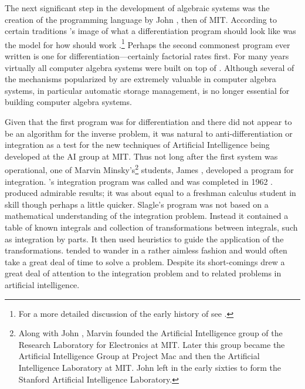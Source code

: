 The next significant step in the development of algebraic systems was
the creation of the programming language {\Lisp} by John {\McCarthy}
\cite{McCarthy1960-bz,McCarthy1969-af}, then of MIT.  According to certain
traditions {\McCarthy}'s image of what a differentiation program should
look like was the model for how {\Lisp} should work
\cite{McCarthy1960-op}.\footnote{For a more detailed
discussion of the early history of {\Lisp} see \cite{Stoyan1984-fn}.}
Perhaps the second commonest {\Lisp} program ever written is one for
differentiation---certainly factorial rates first.  For many years
virtually all computer algebra systems were built on top of {\Lisp}.  Although
several of the mechanisms popularized by {\Lisp} are extremely valuable in
computer algebra systems, in particular automatic storage management, {\Lisp}
is no longer essential for building computer algebra systems.

Given that the first {\Lisp} program was for differentiation and there
did not appear to be an algorithm for the inverse problem, it was
natural to anti-differentiation or integration as a test for the new
techniques of Artificial Intelligence being developed at the AI group
at MIT. Thus not long
after the first {\Lisp} system was operational, one of Marvin
Minsky's\footnote{Along with John {\McCarthy}, Marvin {\Minsky} founded the
Artificial Intelligence group of the Research Laboratory for
Electronics at MIT.  Later this group became the Artificial
Intelligence Group at Project Mac and then the Artificial Intelligence
Laboratory at MIT.  John {\McCarthy} left in the early sixties to form
the Stanford Artificial Intelligence Laboratory.} students, James {\Slagle},
developed a program for integration.  {\Slagle}'s integration program
was called {\Saint} and was completed in 1962 \cite{Slagle1963-dt}.
{\Saint} produced admirable results; it was about equal to a freshman
calculus student in skill though perhaps a little quicker.  Slagle's
program was not based on a mathematical understanding of the
integration problem.  Instead it contained a table of known integrals
and collection of transformations between integrals, such as
integration by parts.  It then used heuristics to guide the
application of the transformations.  {\Saint} tended to wander in a
rather aimless fashion and would often take a great deal of time to
solve a problem.  Despite its short-comings {\Saint} drew a great
deal of attention to the integration problem and to related problems
in artificial intelligence.

